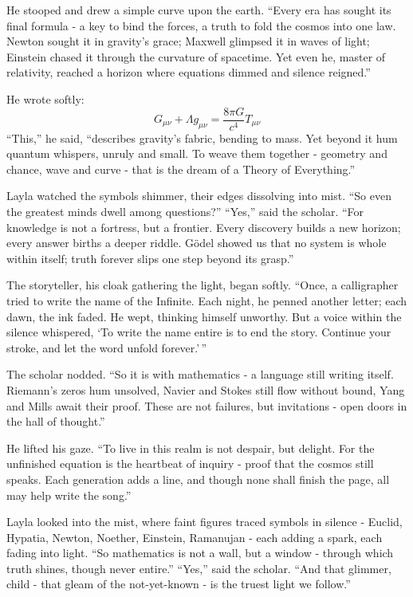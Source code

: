 \documentclass[
  letterpaper,
  DIV=11,
  numbers=noendperiod]{scrreprt}
\begin{document}
He stooped and drew a simple curve upon the earth. ``Every era has
sought its final formula - a key to bind the forces, a truth to fold the
cosmos into one law. Newton sought it in gravity's grace; Maxwell
glimpsed it in waves of light; Einstein chased it through the curvature
of spacetime. Yet even he, master of relativity, reached a horizon where
equations dimmed and silence reigned.''

He wrote softly: \[
G_{\mu\nu} + \Lambda g_{\mu\nu} = \frac{8\pi G}{c^4} T_{\mu\nu}
\] ``This,'' he said, ``describes gravity's fabric, bending to mass. Yet
beyond it hum quantum whispers, unruly and small. To weave them together
- geometry and chance, wave and curve - that is the dream of a Theory of
Everything.''

Layla watched the symbols shimmer, their edges dissolving into mist.
``So even the greatest minds dwell among questions?'' ``Yes,'' said the
scholar. ``For knowledge is not a fortress, but a frontier. Every
discovery builds a new horizon; every answer births a deeper riddle.
Gödel showed us that no system is whole within itself; truth forever
slips one step beyond its grasp.''

The storyteller, his cloak gathering the light, began softly. ``Once, a
calligrapher tried to write the name of the Infinite. Each night, he
penned another letter; each dawn, the ink faded. He wept, thinking
himself unworthy. But a voice within the silence whispered, `To write
the name entire is to end the story. Continue your stroke, and let the
word unfold forever.'\,''

The scholar nodded. ``So it is with mathematics - a language still
writing itself. Riemann's zeros hum unsolved, Navier and Stokes still
flow without bound, Yang and Mills await their proof. These are not
failures, but invitations - open doors in the hall of thought.''

He lifted his gaze. ``To live in this realm is not despair, but delight.
For the unfinished equation is the heartbeat of inquiry - proof that the
cosmos still speaks. Each generation adds a line, and though none shall
finish the page, all may help write the song.''

Layla looked into the mist, where faint figures traced symbols in
silence - Euclid, Hypatia, Newton, Noether, Einstein, Ramanujan - each
adding a spark, each fading into light. ``So mathematics is not a wall,
but a window - through which truth shines, though never entire.''
``Yes,'' said the scholar. ``And that glimmer, child - that gleam of the
not-yet-known - is the truest light we follow.''
\end{document}
